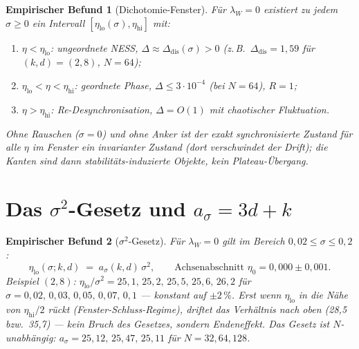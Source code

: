\documentclass[11pt,a4paper]{article}
\newtheorem{befund}{Empirischer Befund}
\theoremstyle{remark}
\begin{document}
\begin{befund}[Dichotomie-Fenster]\label{bef:fenster}
Für $\lambda_W=0$ existiert zu jedem $\sigma\ge0$ ein Intervall
$[\eta_{\mathrm{lo}}(\sigma),\eta_{\mathrm{hi}}]$ mit:
\begin{enumerate}
\item[(i)] $\eta<\eta_{\mathrm{lo}}$: \emph{ungeordnete NESS},
$\Delta\approx\Delta_{\mathrm{dis}}(\sigma)>0$
(z.\,B.\ $\Delta_{\mathrm{dis}}=1{,}59$ für $(k,d)=(2,8)$, $N=64$);
\item[(ii)] $\eta_{\mathrm{lo}}<\eta<\eta_{\mathrm{hi}}$: \emph{geordnete Phase},
$\Delta\le3\cdot10^{-4}$ (bei $N=64$), $R=1$;
\item[(iii)] $\eta>\eta_{\mathrm{hi}}$: \emph{Re-Desynchronisation},
$\Delta=O(1)$ mit chaotischer Fluktuation.
\end{enumerate}
Ohne Rauschen ($\sigma=0$) und ohne Anker ist der exakt synchronisierte
Zustand für \emph{alle} $\eta$ im Fenster ein invarianter Zustand
(dort verschwindet der Drift); die Kanten sind dann
stabilitäts-induzierte Objekte, kein Plateau-Übergang.
\end{befund}

\section{Das $\sigma^2$-Gesetz und $a_\sigma=3d+k$}

\begin{befund}[$\sigma^2$-Gesetz]\label{bef:sigma}
Für $\lambda_W=0$ gilt im Bereich $0{,}02\le\sigma\le0{,}2$:
\[
\eta_{\mathrm{lo}}(\sigma;k,d)\;=\;a_\sigma(k,d)\,\sigma^2,\qquad
\text{Achsenabschnitt } \eta_0 = 0{,}000\pm0{,}001 .
\]
Beispiel $(2,8)$: $\eta_{\mathrm{lo}}/\sigma^2 = 25{,}1,\,25{,}2,\,25{,}5,\,25{,}6,\,26{,}2$
für $\sigma=0{,}02,\,0{,}03,\,0{,}05,\,0{,}07,\,0{,}1$ --- konstant auf
$\pm2\,\%$. Erst wenn $\eta_{\mathrm{lo}}$ in die Nähe von
$\eta_{\mathrm{hi}}/2$ rückt (Fenster-Schluss-Regime), driftet das Verhältnis
nach oben (28{,}5 bzw.\ 35{,}7) --- kein Bruch des Gesetzes, sondern
Endeneffekt. Das Gesetz ist $N$-unabhängig:
$a_\sigma=25{,}12,\,25{,}47,\,25{,}11$ für $N=32,64,128$.
\end{befund}
\end{document}
